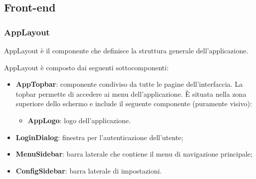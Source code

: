 \subsection{Front-end}

\subsubsection{AppLayout}

\par AppLayout è il componente che definisce la struttura generale dell'applicazione.

\par AppLayout è composto dai seguenti sottocomponenti:
\begin{itemize}
  \item \textbf{AppTopbar}: componente condiviso da tutte le pagine dell'interfaccia. La topbar permette di accedere ai menu dell'applicazione. È situata nella zona superiore dello schermo e include il seguente componente (puramente visivo):
  \begin{itemize}
    \item \textbf{AppLogo}: logo dell'applicazione.
  \end{itemize}
  \item \textbf{LoginDialog}: finestra per l'autenticazione dell'utente;
  \item \textbf{MenuSidebar}: barra laterale che contiene il menu di navigazione principale;
  \item \textbf{ConfigSidebar}: barra laterale di impostazioni.
\end{itemize}

